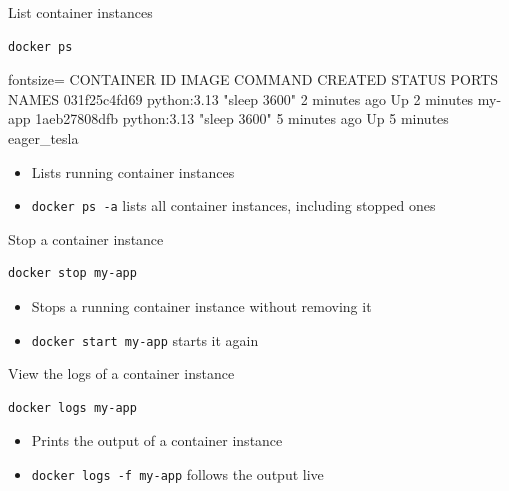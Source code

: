 \documentclass[aspectratio=169]{beamer}
\begin{document}
\begin{frame}[fragile]{List container instances}
  \begin{verbatim}
docker ps
  \end{verbatim}
  \begin{cmdoutput*}{fontsize=\tiny}
CONTAINER ID   IMAGE         COMMAND        CREATED         STATUS         PORTS     NAMES
031f25c4fd69   python:3.13   "sleep 3600"   2 minutes ago   Up 2 minutes             my-app
1aeb27808dfb   python:3.13   "sleep 3600"   5 minutes ago   Up 5 minutes             eager_tesla
  \end{cmdoutput*}

  \begin{itemize}
    \item Lists running container instances
    \item \texttt{docker ps -a} lists all container instances, including stopped ones
  \end{itemize}

\note{
}
\end{frame}


\begin{frame}[fragile]{Stop a container instance}
  \begin{verbatim}
docker stop my-app
  \end{verbatim}

  \begin{itemize}
    \item Stops a running container instance without removing it
    \item \texttt{docker start my-app} starts it again
  \end{itemize}

\note{
}
\end{frame}


\begin{frame}[fragile]{View the logs of a container instance}
  \begin{verbatim}
docker logs my-app
  \end{verbatim}

  \begin{itemize}
    \item Prints the output of a container instance
    \item \texttt{docker logs -f my-app} follows the output live
  \end{itemize}

\note{
}
\end{frame}
\end{document}
